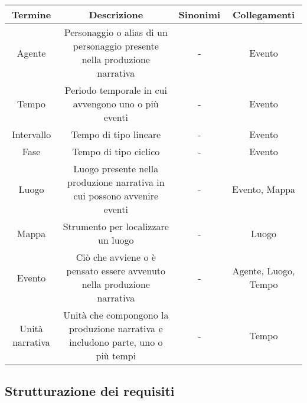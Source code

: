 \documentclass{article}
\begin{document}
\begin{tabular}{ |c|c|c|c| }
	\hline
	\textbf{Termine} & \textbf{Descrizione}                                                            & \textbf{Sinonimi} & \textbf{Collegamenti} \\
	\hline
	Agente           & Personaggio o alias di un personaggio presente nella produzione narrativa       & -                 & Evento                \\
	\hline
	Tempo            & Periodo temporale in cui avvengono uno o più eventi                             & -                 & Evento                \\
	\hline
	Intervallo       & Tempo di tipo lineare                                                           & -                 & Evento                \\
	\hline
	Fase             & Tempo di tipo ciclico                                                           & -                 & Evento                \\
	\hline
	Luogo            & Luogo presente nella produzione narrativa in cui possono avvenire eventi        & -                 & Evento, Mappa         \\
	\hline
	Mappa            & Strumento per localizzare un luogo                                              & -                 & Luogo                 \\
	\hline
	Evento           & Ciò che avviene o è pensato essere avvenuto nella produzione narrativa          & -                 & Agente, Luogo, Tempo  \\
	\hline
	Unità narrativa  & Unità che compongono la produzione narrativa e includono parte, uno o più tempi & -                 & Tempo                 \\
	\hline
\end{tabular}

\subsection{Strutturazione dei requisiti}
\end{document}
